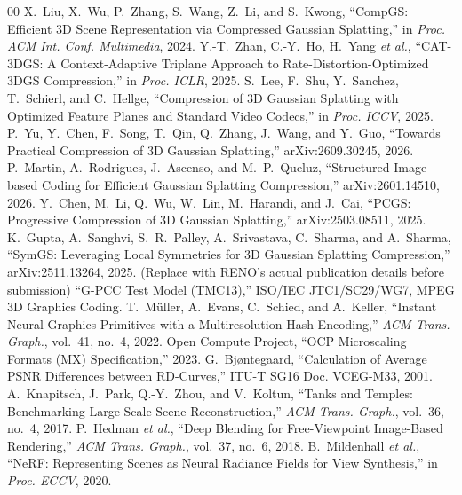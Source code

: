 \documentclass{ieeeaccess}
\begin{document}
\begin{thebibliography}{00}
 X.~Liu, X.~Wu, P.~Zhang, S.~Wang, Z.~Li, and S.~Kwong, ``CompGS: Efficient 3D Scene Representation via Compressed Gaussian Splatting,'' in \emph{Proc. ACM Int. Conf. Multimedia}, 2024.
 Y.-T.~Zhan, C.-Y.~Ho, H.~Yang \emph{et al.}, ``CAT-3DGS: A Context-Adaptive Triplane Approach to Rate-Distortion-Optimized 3DGS Compression,'' in \emph{Proc. ICLR}, 2025.
 S.~Lee, F.~Shu, Y.~Sanchez, T.~Schierl, and C.~Hellge, ``Compression of 3D Gaussian Splatting with Optimized Feature Planes and Standard Video Codecs,'' in \emph{Proc. ICCV}, 2025.
 P.~Yu, Y.~Chen, F.~Song, T.~Qin, Q.~Zhang, J.~Wang, and Y.~Guo, ``Towards Practical Compression of 3D Gaussian Splatting,'' arXiv:2609.30245, 2026.
 P.~Martin, A.~Rodrigues, J.~Ascenso, and M.~P.~Queluz, ``Structured Image-based Coding for Efficient Gaussian Splatting Compression,'' arXiv:2601.14510, 2026.
 Y.~Chen, M.~Li, Q.~Wu, W.~Lin, M.~Harandi, and J.~Cai, ``PCGS: Progressive Compression of 3D Gaussian Splatting,'' arXiv:2503.08511, 2025.
 K.~Gupta, A.~Sanghvi, S.~R.~Palley, A.~Srivastava, C.~Sharma, and A.~Sharma, ``SymGS: Leveraging Local Symmetries for 3D Gaussian Splatting Compression,'' arXiv:2511.13264, 2025.
 (Replace with RENO's actual publication details before submission)
 ``G-PCC Test Model (TMC13),'' ISO/IEC JTC1/SC29/WG7, MPEG 3D Graphics Coding.
 T.~M\"uller, A.~Evans, C.~Schied, and A.~Keller, ``Instant Neural Graphics Primitives with a Multiresolution Hash Encoding,'' \emph{ACM Trans. Graph.}, vol.~41, no.~4, 2022.
 Open Compute Project, ``OCP Microscaling Formats (MX) Specification,'' 2023.
 G.~Bj{\o}ntegaard, ``Calculation of Average PSNR Differences between RD-Curves,'' ITU-T SG16 Doc. VCEG-M33, 2001.
 A.~Knapitsch, J.~Park, Q.-Y.~Zhou, and V.~Koltun, ``Tanks and Temples: Benchmarking Large-Scale Scene Reconstruction,'' \emph{ACM Trans. Graph.}, vol.~36, no.~4, 2017.
 P.~Hedman \emph{et al.}, ``Deep Blending for Free-Viewpoint Image-Based Rendering,'' \emph{ACM Trans. Graph.}, vol.~37, no.~6, 2018.
 B.~Mildenhall \emph{et al.}, ``NeRF: Representing Scenes as Neural Radiance Fields for View Synthesis,'' in \emph{Proc. ECCV}, 2020.
\end{thebibliography}

\EOD
\end{document}

